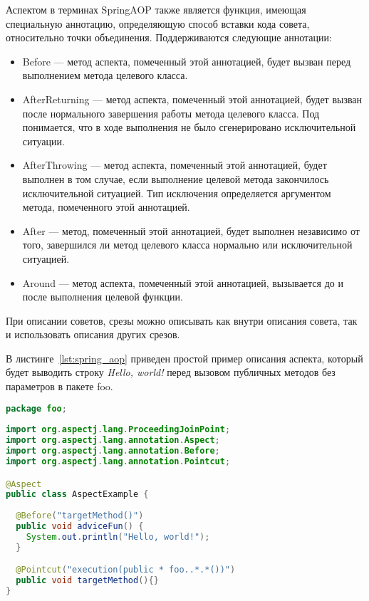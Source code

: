   Аспектом в терминах SpringAOP также является функция, имеющая специальную
  аннотацию, определяющую способ вставки кода совета, относительно точки
  объединения.
  Поддерживаются следующие аннотации:
  \begin{itemize}
    \item Before --- метод аспекта, помеченный этой аннотацией, будет вызван
      перед выполнением метода целевого класса.
    \item AfterReturning --- метод аспекта, помеченный этой аннотацией, 
      будет вызван после нормального завершения работы метода целевого класса.
      Под  понимается, что в ходе выполнения не
      было сгенерировано исключительной ситуации.
    \item AfterThrowing --- метод аспекта, помеченный этой аннотацией, будет 
      выполнен в том случае, если выполнение целевой метода закончилось 
      исключительной ситуацией.
      Тип исключения определяется аргументом метода, помеченного этой 
      аннотацией.
    \item After --- метод, помеченный этой аннотацией, будет выполнен 
    независимо от того, завершился ли метод целевого класса нормально или 
    исключительной ситуацией.
    \item Around --- метод аспекта, помеченный этой аннотацией, вызывается 
    до и после выполнения целевой функции.
  \end{itemize}
  При описании советов, срезы можно описывать как внутри описания совета, так и
  использовать описания других срезов.
  
  В листинге~\ref{lst:spring_aop} приведен простой пример описания аспекта, 
  который будет выводить строку \textit{Hello, world!} перед вызовом 
  публичных методов без параметров в пакете foo.
  \begin{lstlisting}[language=Java, label={lst:spring_aop}, caption={Пример 
  описания аспекта при помощи Spting AOP.}]
package foo;
  
import org.aspectj.lang.ProceedingJoinPoint;
import org.aspectj.lang.annotation.Aspect;
import org.aspectj.lang.annotation.Before;
import org.aspectj.lang.annotation.Pointcut;

@Aspect
public class AspectExample {
  
  @Before("targetMethod()")
  public void adviceFun() {
    System.out.println("Hello, world!");
  }

  @Pointcut("execution(public * foo..*.*())")
  public void targetMethod(){}
}
  \end{lstlisting}
